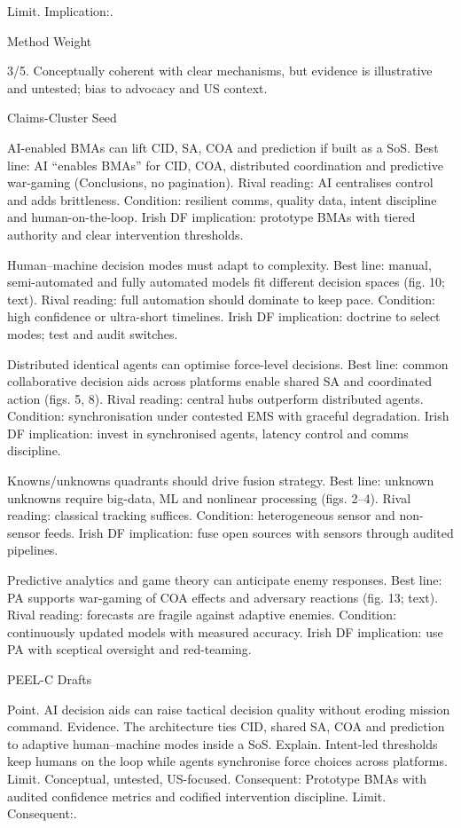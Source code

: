 Limit. Implication:.

Method Weight

3/5. Conceptually coherent with clear mechanisms, but evidence is illustrative and untested; bias to advocacy and US context.

Claims-Cluster Seed

AI-enabled BMAs can lift CID, SA, COA and prediction if built as a SoS.
Best line: AI “enables BMAs” for CID, COA, distributed coordination and predictive war-gaming (Conclusions, no pagination).
Rival reading: AI centralises control and adds brittleness.
Condition: resilient comms, quality data, intent discipline and human-on-the-loop.
Irish DF implication: prototype BMAs with tiered authority and clear intervention thresholds.

Human–machine decision modes must adapt to complexity.
Best line: manual, semi-automated and fully automated models fit different decision spaces (fig. 10; text).
Rival reading: full automation should dominate to keep pace.
Condition: high confidence or ultra-short timelines.
Irish DF implication: doctrine to select modes; test and audit switches.

Distributed identical agents can optimise force-level decisions.
Best line: common collaborative decision aids across platforms enable shared SA and coordinated action (figs. 5, 8).
Rival reading: central hubs outperform distributed agents.
Condition: synchronisation under contested EMS with graceful degradation.
Irish DF implication: invest in synchronised agents, latency control and comms discipline.

Knowns/unknowns quadrants should drive fusion strategy.
Best line: unknown unknowns require big-data, ML and nonlinear processing (figs. 2–4).
Rival reading: classical tracking suffices.
Condition: heterogeneous sensor and non-sensor feeds.
Irish DF implication: fuse open sources with sensors through audited pipelines.

Predictive analytics and game theory can anticipate enemy responses.
Best line: PA supports war-gaming of COA effects and adversary reactions (fig. 13; text).
Rival reading: forecasts are fragile against adaptive enemies.
Condition: continuously updated models with measured accuracy.
Irish DF implication: use PA with sceptical oversight and red-teaming.

PEEL-C Drafts

Point. AI decision aids can raise tactical decision quality without eroding mission command.
Evidence. The architecture ties CID, shared SA, COA and prediction to adaptive human–machine modes inside a SoS.
Explain. Intent-led thresholds keep humans on the loop while agents synchronise force choices across platforms.
Limit. Conceptual, untested, US-focused. Consequent: Prototype BMAs with audited confidence metrics and codified intervention discipline. Limit. Consequent:.

